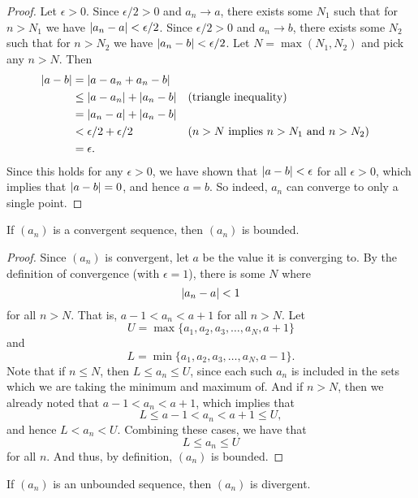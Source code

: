 \begin{proof}
  Let $\epsilon > 0$. Since $\epsilon/2 > 0$ and $a_n \to a$,
  there exists some $N_1$ such that for $n > N_1$ we have $| a_n -
  a | < \epsilon/2$. Since $\epsilon/2 > 0$ and $a_n \to b$,
  there exists some $N_2$ such that for $n > N_2$ we have $| a_n -
  b | < \epsilon/2$. Let $N = \max(N_1, N_2)$ and pick any $n > N$. Then
  \begin{align*}
    | a - b | &= | a - a_n + a_n - b | \\
    &\leq | a - a_n | + | a_n - b | && \text{(triangle inequality)} \\
    &= | a_n - a | + | a_n - b | \\
    &< \epsilon/2 + \epsilon/2 && \text{($n > N$ implies $n >
    N_1$ and $n > N_2$)} \\
    &= \epsilon.
  \end{align*}
  Since this holds for any $\epsilon > 0$, we have shown that
  $| a - b | < \epsilon$ for all $\epsilon > 0$, which
  implies that $| a - b | = 0$, and hence $a = b$. So indeed, $a_n$
  can converge to only a single point.
\end{proof}

\begin{proposition}
  If $(a_n)$ is a convergent sequence, then $(a_n)$ is bounded.
\end{proposition}

\begin{proof}
  Since $(a_n)$ is convergent, let $a$ be the value it is converging
  to. By the definition of convergence (with $\epsilon = 1$), there
  is some $N$ where
  \[ | a_n - a | < 1 \]
  for all $n > N$. That is, $a - 1 < a_n < a + 1$ for all $n > N$. Let
  \[ U = \max \{a_1, a_2, a_3, \dots, a_N, a + 1\} \]
  and
  \[ L = \min \{a_1, a_2, a_3, \dots, a_N, a - 1\}. \]
  Note that if $n \leq N$, then $L \leq a_n \leq U$, since each such
  $a_n$ is included in the sets which we are taking the minimum and
  maximum of. And if $n > N$, then we already noted that $a - 1 < a_n
  < a + 1$, which implies that
  \[ L \leq a - 1 < a_n < a + 1 \leq U, \]
  and hence $L < a_n < U$. Combining these cases, we have that
  \[ L \leq a_n \leq U \]
  for all $n$. And thus, by definition, $(a_n)$ is bounded.
\end{proof}

\begin{corollary}
  If $(a_n)$ is an unbounded sequence, then $(a_n)$ is divergent.
\end{corollary}


